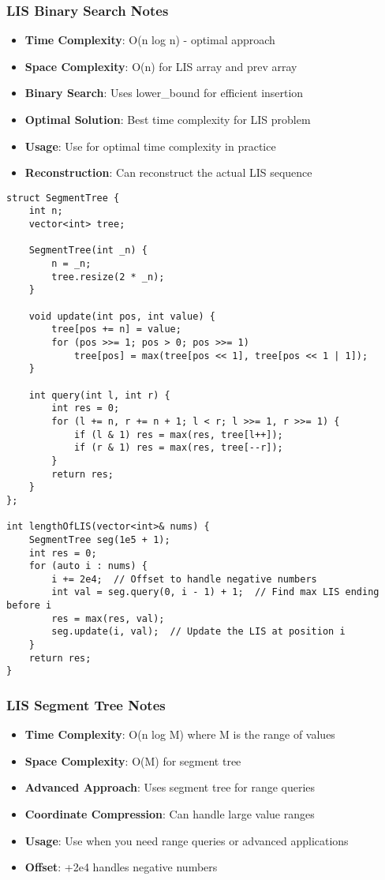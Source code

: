 \documentclass[11pt,a4paper]{article}
\begin{document}
\subsubsection*{LIS Binary Search Notes}
\begin{itemize}
\item \textbf{Time Complexity}: O(n log n) - optimal approach
\item \textbf{Space Complexity}: O(n) for LIS array and prev array
\item \textbf{Binary Search}: Uses lower\_bound for efficient insertion
\item \textbf{Optimal Solution}: Best time complexity for LIS problem
\item \textbf{Usage}: Use for optimal time complexity in practice
\item \textbf{Reconstruction}: Can reconstruct the actual LIS sequence
\end{itemize}

\newpage
\begin{lstlisting}[caption={LIS - Segment Tree Implementation}]
struct SegmentTree {
    int n;
    vector<int> tree;
    
    SegmentTree(int _n) {
        n = _n;
        tree.resize(2 * _n);
    }

    void update(int pos, int value) {
        tree[pos += n] = value;
        for (pos >>= 1; pos > 0; pos >>= 1) 
            tree[pos] = max(tree[pos << 1], tree[pos << 1 | 1]);
    }

    int query(int l, int r) {
        int res = 0;
        for (l += n, r += n + 1; l < r; l >>= 1, r >>= 1) {
            if (l & 1) res = max(res, tree[l++]);
            if (r & 1) res = max(res, tree[--r]);
        }
        return res;
    }
};

int lengthOfLIS(vector<int>& nums) {
    SegmentTree seg(1e5 + 1);
    int res = 0;
    for (auto i : nums) {
        i += 2e4;  // Offset to handle negative numbers
        int val = seg.query(0, i - 1) + 1;  // Find max LIS ending before i
        res = max(res, val);
        seg.update(i, val);  // Update the LIS at position i
    }
    return res;
}
\end{lstlisting}

\subsubsection*{LIS Segment Tree Notes}
\begin{itemize}
\item \textbf{Time Complexity}: O(n log M) where M is the range of values
\item \textbf{Space Complexity}: O(M) for segment tree
\item \textbf{Advanced Approach}: Uses segment tree for range queries
\item \textbf{Coordinate Compression}: Can handle large value ranges
\item \textbf{Usage}: Use when you need range queries or advanced applications
\item \textbf{Offset}: +2e4 handles negative numbers
\end{itemize}
\end{document}
